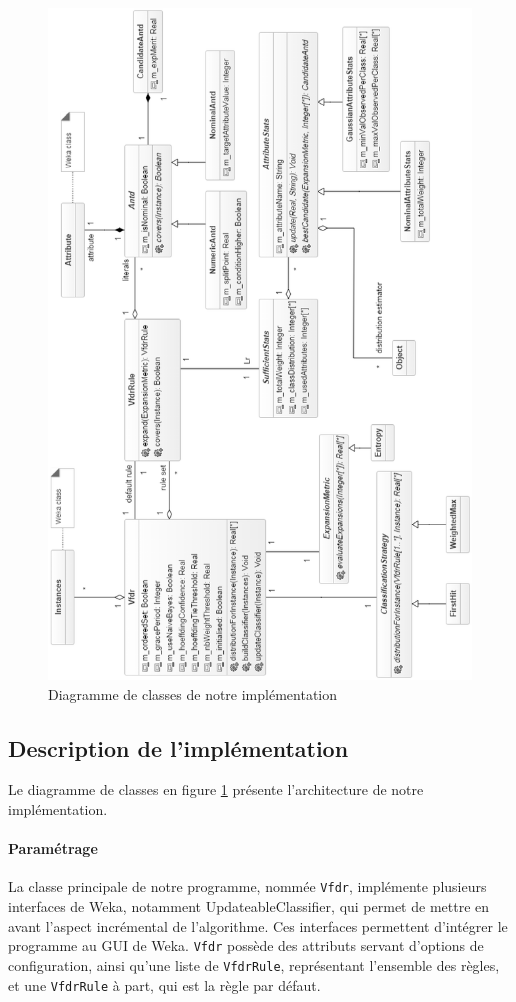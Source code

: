     \begin{figure}
        \includegraphics[width=\textwidth]{src/image2}
        \caption{Diagramme de classes de notre implémentation}
        \label{fig:dclass}
    \end{figure}


    \subsection{Description de l'implémentation}

        Le diagramme de classes en figure \ref{fig:dclass} présente l'architecture de notre implémentation.

        \paragraph{Paramétrage} La classe principale de notre programme, nommée \texttt{Vfdr}, implémente plusieurs interfaces de Weka, notamment UpdateableClassifier, qui permet de mettre en avant l’aspect incrémental de l’algorithme. Ces interfaces permettent d'intégrer le programme au GUI de Weka. \texttt{Vfdr} possède des attributs servant d’options de configuration, ainsi qu’une liste de \texttt{VfdrRule}, représentant l’ensemble des règles, et une \texttt{VfdrRule} à part, qui est la règle par défaut.

